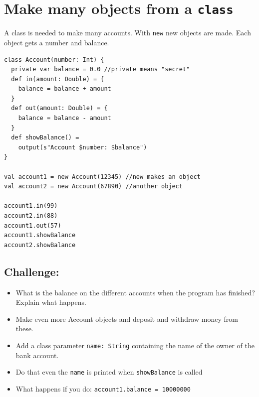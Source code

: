 \chapter{Make many objects from a \lstinline{class}}
\begin{multicols}{2}
A class is needed to make many accounts. With \lstinline{new} new objects are made. Each object gets a number and balance.

\begin{lstlisting}[basicstyle={\ttfamily\fontsize{13}{16}\selectfont},numbers=none]
class Account(number: Int) {
  private var balance = 0.0 //private means "secret"  
  def in(amount: Double) = {
    balance = balance + amount
  }
  def out(amount: Double) = {
    balance = balance - amount
  }
  def showBalance() = 
    output(s"Account $number: $balance")
}

val account1 = new Account(12345) //new makes an object
val account2 = new Account(67890) //another object

account1.in(99)
account2.in(88)
account1.out(57)
account1.showBalance
account2.showBalance
\end{lstlisting}
        


\columnbreak


\section*{\color{BrickRed}Challenge:}


\begin{itemize}

\item {What is the balance on the different accounts when the program has finished? Explain what happens.}
\item {Make even more Account objects and deposit and withdraw money from these.}
\item {Add a class parameter \lstinline{name: String} containing the name of the owner of the bank account.}
\item {Do that even the \lstinline{name} is printed when \lstinline{showBalance} is called}
\item {What happens if you do: \lstinline{account1.balance = 10000000 }}

\end{itemize}


\end{multicols}

